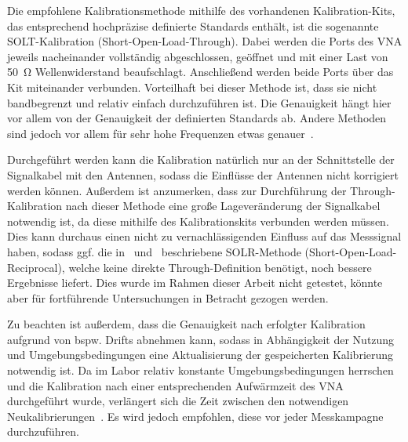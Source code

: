 Die empfohlene Kalibrationsmethode mithilfe des vorhandenen Kalibration-Kits, das entsprechend hochpräzise definierte Standards enthält, ist die sogenannte SOLT-Kalibration (Short-Open-Load-Through). Dabei werden die Ports des VNA jeweils nacheinander vollständig abgeschlossen, geöffnet und mit einer Last von \SI{50}{\ohm} Wellenwiderstand beaufschlagt. Anschließend werden beide Ports über das Kit miteinander verbunden. Vorteilhaft bei dieser Methode ist, dass sie nicht bandbegrenzt und relativ einfach durchzuführen ist. Die Genauigkeit hängt hier vor allem von der Genauigkeit der definierten Standards ab. Andere Methoden sind jedoch vor allem für sehr hohe Frequenzen etwas genauer~\cite{VNA-Calibration_Application_Note}. 
\par
\vspace{\linespace}
Durchgeführt werden kann die Kalibration natürlich nur an der Schnittstelle der Signalkabel mit den Antennen, sodass die Einflüsse der Antennen nicht korrigiert werden können. Außerdem ist anzumerken, dass zur Durchführung der \glqq Through\grqq-Kalibration nach dieser Methode eine große Lageveränderung der Signalkabel notwendig ist, da diese mithilfe des Kalibrationskits verbunden werden müssen. Dies kann durchaus einen nicht zu vernachlässigenden Einfluss auf das Messsignal haben, sodass ggf. die in~\cite{VNA-Calibration_Application_Note} und~\cite{VNA-Handbuch} beschriebene SOLR-Methode (Short-Open-Load-Reciprocal), welche keine direkte \glqq Through\grqq-Definition benötigt, noch bessere Ergebnisse liefert. Dies wurde im Rahmen dieser Arbeit nicht getestet, könnte aber für fortführende Untersuchungen in Betracht gezogen werden.
\par
\vspace{\linespace}
Zu beachten ist außerdem, dass die Genauigkeit nach erfolgter Kalibration aufgrund von bspw. Drifts abnehmen kann, sodass in Abhängigkeit der Nutzung und Umgebungsbedingungen eine Aktualisierung der gespeicherten Kalibrierung notwendig ist. Da im Labor relativ konstante Umgebungsbedingungen herrschen und die Kalibration nach einer entsprechenden Aufwärmzeit des VNA durchgeführt wurde, verlängert sich die Zeit zwischen den notwendigen Neukalibrierungen~\cite{VNA-Handbuch, VNA_Error_Models_and_Calibration_Methods}. Es wird jedoch empfohlen, diese vor jeder Messkampagne durchzuführen.









